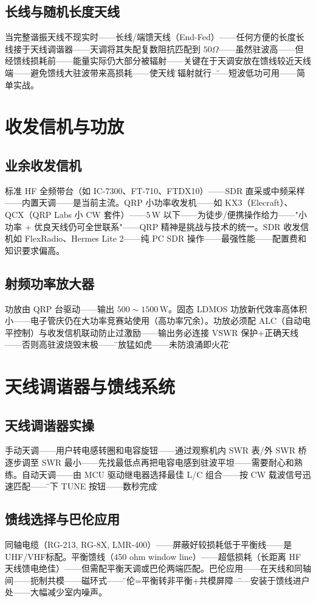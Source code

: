 \documentclass[12pt,UTF8]{ctexbook}
\begin{document}
\subsection{长线与随机长度天线}
当完整谐振天线不现实时——长线/端馈天线（End-Fed）——任何方便的长度长线接于天线调谐器——天调将其失配复数阻抗匹配到 $50\Omega$——虽然驻波高——但经馈线损耗前——能量实际仍大部分被辐射——关键在于天调安放在馈线较近天线端——避免馈线大驻波带来高损耗——使天线\"能辐射就行\"——短波低功可用——简单实战。

\section{收发信机与功放}
\label{sec:ham_transceiver}

\subsection{业余收发信机}
标准 HF 全频带台（如 IC-7300、FT-710、FTDX10）——SDR 直采或中频采样——内置天调——是当前主流。QRP 小功率收发机——如 KX3（Elecraft）、QCX（QRP Labs 小 CW 套件）——$5\,\mathrm{W}$ 以下——为徒步/便携操作给力——"小功率 + 优良天线仍可全世联系"——QRP 精神是挑战与技术的统一。SDR 收发信机如 FlexRadio、Hermes Lite 2——纯 PC SDR 操作——最强性能——配置费和知识要求偏高。

\subsection{射频功率放大器}
功放由 QRP 台驱动——输出 $500\sim1500\,\mathrm{W}$。固态 LDMOS 功放新代效率高体积小——电子管庆仍在大功率竞赛站使用（高功率冗余）。功放必须配 ALC（自动电平控制）与收发信机联动防止过激励——输出务必连接 VSWR 保护+正确天线——否则高驻波烧毁末极——\"功放猛如虎——未防浪涌即火花\"。

\section{天线调谐器与馈线系统}
\label{sec:ham_tuner_feedline}

\subsection{天线调谐器实操}
手动天调——用户转电感转圈和电容旋钮——通过观察机内 SWR 表/外 SWR 桥逐步调至 SWR 最小——先找最低点再把电容电感到驻波平坦——需要耐心和熟练。自动天调——由 MCU 驱动继电器选择最佳 L/C 组合——按 CW 载波信号迅速匹配——\"按下 TUNE 按钮——数秒完成\"。

\subsection{馈线选择与巴伦应用}
同轴电缆（RG-213, RG-8X, LMR-400）——屏蔽好较损耗低于平衡线——是UHF/VHF标配。平衡馈线（450 ohm window line）——超低损耗（长距离 HF 天线馈电绝佳）——但需配平衡天调或巴伦两端匹配。巴伦应用——在天线和同轴间——扼制共模——磁环式——\"巴伦=平衡转非平衡+共模屏障\"——安装于馈线进户处——大幅减少室内噪声。
\end{document}
